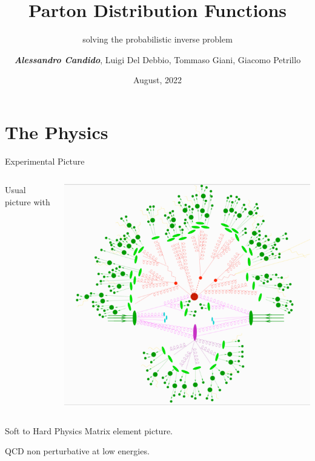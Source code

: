 \documentclass[9pt]{beamer}
\title{Parton Distribution Functions}
\subtitle{solving the probabilistic inverse problem}
\date{August, 2022}
\author{\textit{\textbf{Alessandro Candido}}, Luigi Del Debbio, Tommaso Giani, Giacomo Petrillo}
\begin{document}
\maketitle


\section{The Physics}

\begin{frame}{Experimental Picture}
    \begin{columns}
        \begin{column}{0.5\textwidth}
            Usual picture with 
        \end{column}
        \begin{column}{0.5\textwidth}
            \includegraphics[width=\textwidth]{proton-to-detector}
        \end{column}
    \end{columns}
\end{frame}

\begin{frame}{Soft to Hard Physics}
    Matrix element picture.

    QCD non perturbative at low energies.
\end{frame}
\end{document}
